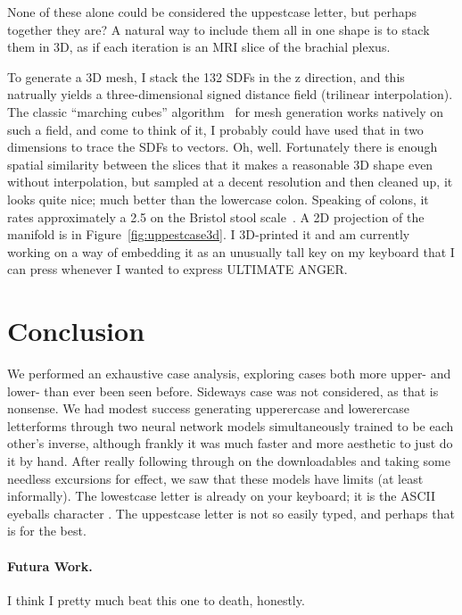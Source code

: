\documentclass[twocolumn]{article}
\begin{document}
None of these alone could be considered the uppestcase letter, but
perhaps together they are? A natural way to include them all in one
shape is to stack them in 3D, as if each iteration is an MRI slice of
the brachial plexus.

To generate a 3D mesh, I stack the 132 SDFs in the z direction, and
this natrually yields a three-dimensional signed distance field
(trilinear interpolation). The classic ``marching cubes''
algorithm~\cite{lorensen1987marching} for mesh generation works
natively on such a field, and come to think of it, I probably could
have used that in two dimensions to trace the SDFs to vectors. Oh,
well. Fortunately there is enough spatial similarity between the
slices that it makes a reasonable 3D shape even without interpolation,
but sampled at a decent resolution and then cleaned up, it looks quite
nice; much better than the lowercase colon. Speaking of colons, it
rates approximately a 2.5 on the Bristol stool
scale~\cite{lewis1997bristol}. A 2D projection of the manifold is in
Figure~\ref{fig:uppestcase3d}. I 3D-printed it and am currently
working on a way of embedding it as an unusually tall key on my
keyboard that I can press whenever I wanted to express ULTIMATE ANGER.

\section{Conclusion}
We performed an exhaustive case analysis, exploring cases both more
upper- and lower- than ever been seen before. Sideways case was not
considered, as that is nonsense. We had modest success generating
upperercase and lowerercase letterforms through two neural network
models simultaneously trained to be each other's inverse, although
frankly it was much faster and more aesthetic to just do it by hand.
After really following through on the downloadables and taking some
needless excursions for effect, we saw that these models have
limits (at least informally). The lowestcase letter is already
on your keyboard; it is the ASCII eyeballs character .
The uppestcase letter is not so easily typed, and perhaps that
is for the best.

\paragraph{Futura Work.}
I think I pretty much beat this one to death, honestly.
\end{document}
